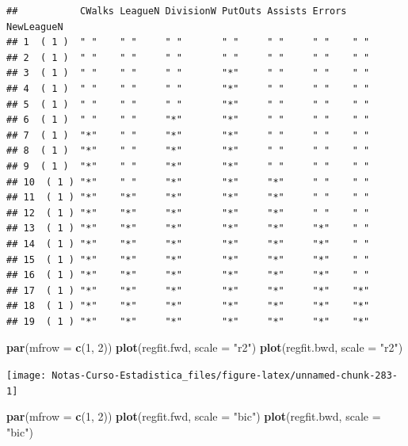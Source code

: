 \documentclass[
  12pt,
]{book}
\newenvironment{Shaded}{\begin{snugshade}}{\end{snugshade}}
\newcommand{\DataTypeTok}[1]{\textcolor[rgb]{0.13,0.29,0.53}{#1}}
\newcommand{\DecValTok}[1]{\textcolor[rgb]{0.00,0.00,0.81}{#1}}
\newcommand{\KeywordTok}[1]{\textcolor[rgb]{0.13,0.29,0.53}{\textbf{#1}}}
\newcommand{\NormalTok}[1]{#1}
\newcommand{\StringTok}[1]{\textcolor[rgb]{0.31,0.60,0.02}{#1}}
\theoremstyle{definition}
\theoremstyle{definition}
\theoremstyle{definition}
\theoremstyle{remark}
\begin{document}
\begin{verbatim}
##           CWalks LeagueN DivisionW PutOuts Assists Errors NewLeagueN
## 1  ( 1 )  " "    " "     " "       " "     " "     " "    " "       
## 2  ( 1 )  " "    " "     " "       " "     " "     " "    " "       
## 3  ( 1 )  " "    " "     " "       "*"     " "     " "    " "       
## 4  ( 1 )  " "    " "     " "       "*"     " "     " "    " "       
## 5  ( 1 )  " "    " "     " "       "*"     " "     " "    " "       
## 6  ( 1 )  " "    " "     "*"       "*"     " "     " "    " "       
## 7  ( 1 )  "*"    " "     "*"       "*"     " "     " "    " "       
## 8  ( 1 )  "*"    " "     "*"       "*"     " "     " "    " "       
## 9  ( 1 )  "*"    " "     "*"       "*"     " "     " "    " "       
## 10  ( 1 ) "*"    " "     "*"       "*"     "*"     " "    " "       
## 11  ( 1 ) "*"    "*"     "*"       "*"     "*"     " "    " "       
## 12  ( 1 ) "*"    "*"     "*"       "*"     "*"     " "    " "       
## 13  ( 1 ) "*"    "*"     "*"       "*"     "*"     "*"    " "       
## 14  ( 1 ) "*"    "*"     "*"       "*"     "*"     "*"    " "       
## 15  ( 1 ) "*"    "*"     "*"       "*"     "*"     "*"    " "       
## 16  ( 1 ) "*"    "*"     "*"       "*"     "*"     "*"    " "       
## 17  ( 1 ) "*"    "*"     "*"       "*"     "*"     "*"    "*"       
## 18  ( 1 ) "*"    "*"     "*"       "*"     "*"     "*"    "*"       
## 19  ( 1 ) "*"    "*"     "*"       "*"     "*"     "*"    "*"
\end{verbatim}

\begin{Shaded}
\begin{Highlighting}[]
\KeywordTok{par}\NormalTok{(}\DataTypeTok{mfrow =} \KeywordTok{c}\NormalTok{(}\DecValTok{1}\NormalTok{, }\DecValTok{2}\NormalTok{))}
\KeywordTok{plot}\NormalTok{(regfit.fwd, }\DataTypeTok{scale =} \StringTok{"r2"}\NormalTok{)}
\KeywordTok{plot}\NormalTok{(regfit.bwd, }\DataTypeTok{scale =} \StringTok{"r2"}\NormalTok{)}
\end{Highlighting}
\end{Shaded}

\begin{center}\texttt{[image: Notas-Curso-Estadistica\_files/figure-latex/unnamed-chunk-283-1]} \end{center}

\begin{Shaded}
\begin{Highlighting}[]
\KeywordTok{par}\NormalTok{(}\DataTypeTok{mfrow =} \KeywordTok{c}\NormalTok{(}\DecValTok{1}\NormalTok{, }\DecValTok{2}\NormalTok{))}
\KeywordTok{plot}\NormalTok{(regfit.fwd, }\DataTypeTok{scale =} \StringTok{"bic"}\NormalTok{)}
\KeywordTok{plot}\NormalTok{(regfit.bwd, }\DataTypeTok{scale =} \StringTok{"bic"}\NormalTok{)}
\end{Highlighting}
\end{Shaded}
\end{document}
